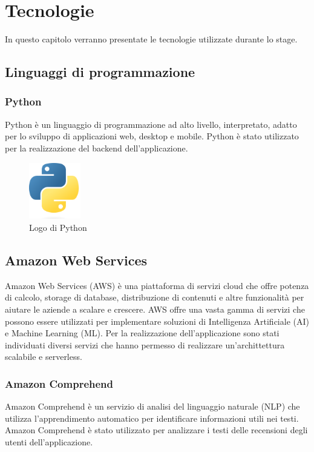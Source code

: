 \chapter{Tecnologie}
\label{cap:tecnologie}
In questo capitolo verranno presentate le tecnologie utilizzate durante lo stage.
\section{Linguaggi di programmazione}
\subsection{Python}
Python è un linguaggio di programmazione ad alto livello, interpretato, adatto per lo sviluppo di applicazioni web, desktop e mobile. Python è stato utilizzato per la realizzazione del backend dell'applicazione.

\begin{figure}[h]
  \centering
  \includegraphics[width=0.2\textwidth]{img/tecnologie/python.png}
  \caption{Logo di Python}
  \label{fig:python}
\end{figure}



\section{Amazon Web Services}
Amazon Web Services (AWS) è una piattaforma di servizi cloud che offre potenza di calcolo, storage di database, distribuzione di contenuti e altre funzionalità per aiutare le aziende a scalare e crescere. AWS offre una vasta gamma di servizi che possono essere utilizzati per implementare soluzioni di Intelligenza Artificiale (AI) e Machine Learning (ML). Per la realizzazione dell'applicazione sono stati individuati diversi servizi che hanno permesso di realizzare un'archittettura scalabile e serverless. 

\subsection{Amazon Comprehend}
Amazon Comprehend è un servizio di analisi del linguaggio naturale (NLP) che utilizza l'apprendimento automatico per identificare informazioni utili nei testi. Amazon Comprehend è stato utilizzato per analizzare i testi delle recensioni degli utenti dell'applicazione.

